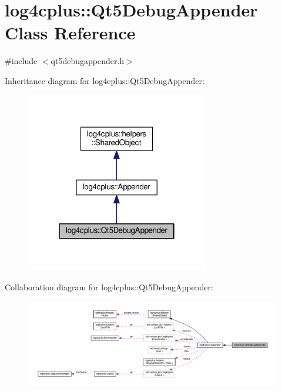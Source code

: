 \hypertarget{classlog4cplus_1_1Qt5DebugAppender}{\section{log4cplus\-:\-:Qt5\-Debug\-Appender Class Reference}
\label{classlog4cplus_1_1Qt5DebugAppender}
}


{\ttfamily \#include $<$qt5debugappender.\-h$>$}



Inheritance diagram for log4cplus\-:\-:Qt5\-Debug\-Appender\-:
\nopagebreak
\begin{figure}[H]
\begin{center}
\leavevmode
\includegraphics[width=226pt]{classlog4cplus_1_1Qt5DebugAppender__inherit__graph}
\end{center}
\end{figure}


Collaboration diagram for log4cplus\-:\-:Qt5\-Debug\-Appender\-:
\nopagebreak
\begin{figure}[H]
\begin{center}
\leavevmode
\includegraphics[width=350pt]{classlog4cplus_1_1Qt5DebugAppender__coll__graph}
\end{center}
\end{figure}
